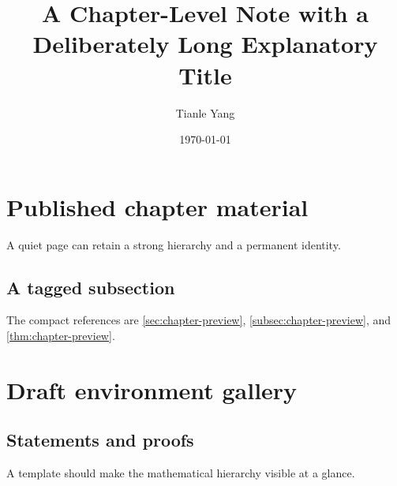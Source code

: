 \documentclass[sectionlevel=chapter,status=draft]{noteformyself}
\title{A Chapter-Level Note with a Deliberately Long Explanatory Title}
\author{Tianle Yang}
\date{\today}
\begin{document}
\maketitle
\tableofcontents

\section[
  status=published,
  tag=0CH01,
  label=\labelNFM{sec:chapter-preview}
]{Published chapter material}

\begin{theorem}[
  title={A small test theorem},
  status=published,
  tag=0CH0101,
  label=\labelNFM{thm:chapter-preview}
]
  A quiet page can retain a strong hierarchy and a permanent identity.
\end{theorem}

\subsection[
  status=published,
  tag=0CH0102,
  label=\labelNFM{subsec:chapter-preview}
]{A tagged subsection}

The compact references are \cref{sec:chapter-preview},
\cref{subsec:chapter-preview}, and \cref{thm:chapter-preview}.

\section[
  short-title={Environment gallery},
  status=draft,
  tag=0CH02,
  label=\labelNFM{sec:chapter-gallery}
]{Draft environment gallery}

\subsection[
  tag=0CH0201,
  label=\labelNFM{subsec:chapter-gallery}
]{Statements and proofs}

\begin{slogan}
  A template should make the mathematical hierarchy visible at a glance.
\end{slogan}
\end{document}
